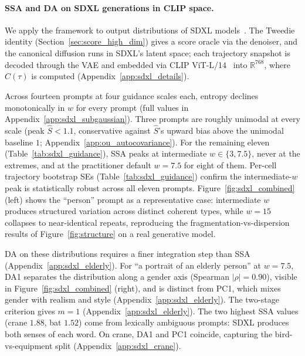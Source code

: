 \documentclass{article}
\newcommand{\R}{\mathbb{R}}
\begin{document}
\paragraph{SSA and DA on SDXL generations in CLIP space.}
\label{sec:exp_sdxl}

We apply the framework to output distributions of SDXL
models~\cite{rombach2022ldm,podell2024sdxl}. The Tweedie identity
(Section~\ref{sec:score_high_dim}) gives a score oracle via the
denoiser, and the canonical diffusion runs in SDXL's latent space;
each trajectory snapshot is decoded through the VAE and embedded via
CLIP ViT-L/14~\cite{radford2021learning} into $\R^{768}$, where
$\hat C(\tau)$ is computed (Appendix~\ref{app:sdxl_details}).

Across fourteen prompts at four guidance scales each, entropy
declines monotonically in $w$ for every prompt (full values in
Appendix~\ref{app:sdxl_subgaussian}). Three prompts are roughly unimodal at every scale (peak $\hat S < 1.1$, conservative against $\hat S$'s upward bias above the unimodal baseline $1$; Appendix~\ref{app:ou_autocovariance}).  For the remaining eleven (Table~\ref{tab:sdxl_guidance}), SSA peaks at intermediate $w \in \{3, 7.5\}$, never at the extremes, and at the practitioner default $w = 7.5$ for eight of them. Per-cell trajectory bootstrap SEs (Table~\ref{tab:sdxl_guidance}) confirm the intermediate-$w$ peak is statistically robust across all eleven prompts. Figure~\ref{fig:sdxl_combined} (left) shows the
``person'' prompt as a representative case: intermediate $w$
produces structured variation across distinct coherent types, while
$w = 15$ collapses to near-identical repeats, reproducing the fragmentation-vs-dispersion results of
Figure~\ref{fig:structure} on a real generative model.

DA on these distributions requires a finer integration step than
SSA (Appendix~\ref{app:sdxl_elderly}). For ``a portrait of an elderly person'' at $w = 7.5$, DA1
separates the distribution along a gender axis (Spearman
$|\rho| = 0.90$), visible in Figure~\ref{fig:sdxl_combined} (right),
and is distinct from PC1, which mixes gender with realism and style
(Appendix~\ref{app:sdxl_elderly}). The two-stage criterion gives
$m = 1$ (Appendix~\ref{app:sdxl_elderly}). The two highest SSA values (crane $1.88$, bat $1.52$) come from lexically ambiguous prompts: SDXL produces both senses of each word. On crane, DA1 and PC1 coincide, capturing the bird-vs-equipment split (Appendix~\ref{app:sdxl_crane}).
\end{document}
